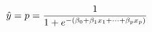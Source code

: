 \documentclass[preview]{standalone}
\begin{document}
\begin{align*}
\special{dvisvgm:raw <g id='unique000'>}\hat{y}=p=\frac{1}{1+e^{-(\beta_0+\beta_1x_1+\cdots+\beta_px_p)}}\special{dvisvgm:raw </g>}
\end{align*}
\end{document}

